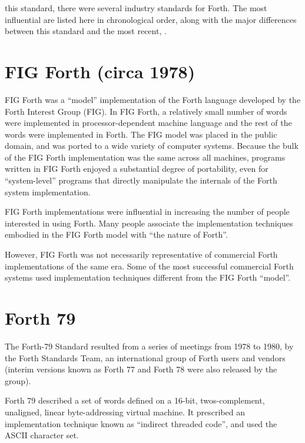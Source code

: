\cbstart{}
\cbend
\label{annex:diff}

 this standard, there were several industry standards for Forth.
The most influential are listed here in chronological order, along
with the major differences between this standard and the most recent,
.

\section{FIG Forth (circa 1978)} %

FIG Forth was a ``model'' implementation of the Forth language
developed by the Forth Interest Group (FIG). In FIG Forth, a
relatively small number of words were implemented in processor-dependent
machine language and the rest of the words were implemented in Forth.
The FIG model was placed in the public domain, and was ported to a wide
variety of computer systems. Because the bulk of the FIG Forth
implementation was the same across all machines, programs written in
FIG Forth enjoyed a substantial degree of portability, even for
``system-level'' programs that directly manipulate the internals
of the Forth system implementation.

FIG Forth implementations were influential in increasing the number
of people interested in using Forth. Many people associate the
implementation techniques embodied in the FIG Forth model with
``the nature of Forth''.

However, FIG Forth was not necessarily representative of commercial
Forth implementations of the same era. Some of the most successful
commercial Forth systems used implementation techniques different
from the FIG Forth ``model''.


\section{Forth 79} %

The Forth-79 Standard resulted from a series of meetings from 1978
to 1980, by the Forth Standards Team, an international group of Forth
users and vendors (interim versions known as Forth 77 and Forth 78
were also released by the group).

Forth 79 described a set of words defined on a 16-bit, twos-complement,
unaligned, linear byte-addressing virtual machine. It prescribed an
implementation technique known as ``indirect threaded code'', and used
the ASCII character set.

